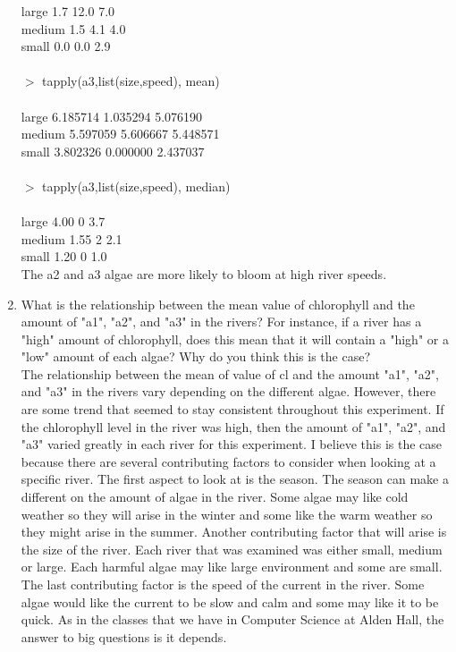 \documentclass{article}
\newcommand{\itab}[1]{\hspace{0em}\rlap{#1}}
\newcommand{\tab}[1]{\hspace{.09\textwidth}\rlap{#1}}
\begin{document}
\begin{enumerate}
large   1.7 12.0    7.0
\\
medium  1.5  4.1    4.0
\\
small   0.0  0.0    2.9
\\
\\
$>$ tapply(a3,list(size,speed), mean)
\\
           \itab{high}      \tab{low}  \tab{medium}
\\
large  6.185714 1.035294 5.076190
\\
medium 5.597059 5.606667 5.448571
\\
small  3.802326 0.000000 2.437037
\\
\\
$>$ tapply(a3,list(size,speed), median)
\\
       \itab{high} \tab{low} \tab{medium}
\\       
large  4.00   0    3.7
\\
medium 1.55   2    2.1
\\
small  1.20   0    1.0
\\
The a2 and a3 algae are more likely to bloom at high river speeds.
\\
\item What is the relationship between the mean value of chlorophyll and the amount of "a1", "a2", and "a3" in the rivers? For instance, if a river has a "high" amount of chlorophyll, does this mean that it will contain a "high" or a "low" amount of each algae? Why do you think this is the case?
\\
The relationship between the mean of value of cl and the amount "a1", "a2", and "a3" in the rivers vary depending on the different algae. However, there are some trend that seemed to stay consistent throughout this experiment. If the chlorophyll level in the river was high, then the amount of "a1", "a2", and "a3" varied greatly in each river for this experiment. I believe this is the case because there are several contributing factors to consider when looking at a specific river. The first aspect to look at is the season. The season can make a different on the amount of algae in the river. Some algae may like cold weather so they will arise in the winter and some like the warm weather so they might arise in the summer. Another contributing factor that will arise is the size of the river. Each river that was examined was either small, medium or large. Each harmful algae may like large environment and some are small. The last contributing factor is the speed of the current in the river. Some algae would like the current to be slow and calm and some may like it to be quick. As in the classes that we have in Computer Science at Alden Hall, the answer to big questions is it depends.
\end{enumerate}
\end{document}
